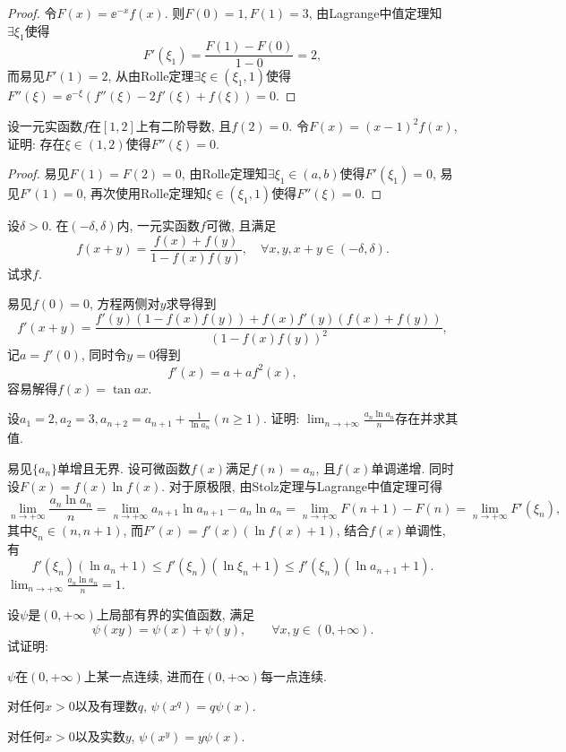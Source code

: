 \begin{quiza}
\begin{proof}
令\(F(x)=\ee^{-x}f(x).\) 则\(F(0)=1,F(1)=3\), 由Lagrange中值定理知\(\exists \xi_1\)使得\[F'(\xi_1)=\frac{F(1)-F(0)}{1-0}=2,\]而易见\(F'(1)=2\), 从由Rolle定理\(\exists \xi\in(\xi_1,1)\)使得\(F''(\xi)=\ee^{-\xi}\left(f''(\xi)-2f'(\xi)+f(\xi)\right)=0\).
\end{proof}
\woe 设一元实函数\(f\)在\([1,2]\)上有二阶导数, 且\(f(2)=0\). 令\(F(x)=(x-1)^2f(x)\), 证明: 存在\(\xi\in(1,2)\)使得\(F''(\xi)=0.\)
\begin{proof}
易见\(F(1)=F(2)=0\), 由Rolle定理知\(\exists \xi_1\in(a,b)\)使得\(F'(\xi_1)=0\), 易见\(F'(1)=0\), 再次使用Rolle定理知\(\xi\in(\xi_1,1)\)使得\(F''(\xi)=0\).
\end{proof}
\woe 设\(\delta>0\). 在\((-\delta,\delta)\)内, 一元实函数\(f\)可微, 且满足\[f(x+y)=\frac{f(x)+f(y)}{1-f(x)f(y)},\quad\forall x,y,x+y\in(-\delta,\delta).\]试求\(f\).
\begin{solution}
易见\(f(0)=0\), 方程两侧对\(y\)求导得到\[f'(x+y)=\frac{f'(y)\left(1-f(x)f(y)\right)+f(x)f'(y)\left(f(x)+f(y)\right)}{\left(1-f(x)f(y)\right)^2},\]记\(a=f'(0)\), 同时令\(y=0\)得到\[f'(x)=a+af^2(x),\]容易解得\(f(x)=\tan ax.\)
\end{solution}
\woe 设\(a_1=2,a_2=3,a_{n+2}=a_{n+1}+\frac{1}{\ln a_n}(n\geqslant 1)\). 证明: \(\lim_{n\rightarrow+\infty}\frac{a_n\ln a_n}{n}\)存在并求其值.
\begin{solution}
易见\(\{a_n\}\)单增且无界. 设可微函数\(f(x)\)满足\(f(n)=a_n\), 且\(f(x)\)单调递增. 同时设\(F(x)=f(x)\ln f(x)\). 对于原极限, 由Stolz定理与Lagrange中值定理可得\[\lim_{n\rightarrow+\infty}\frac{a_n\ln a_n}{n}=\lim_{n\rightarrow+\infty}a_{n+1}\ln a_{n+1}-a_n\ln a_n=\lim_{n\rightarrow+\infty}F(n+1)-F(n)=\lim_{n\rightarrow+\infty}F'(\xi_n),\]其中\(\xi_n\in(n,n+1)\), 而\(F'(x)=f'(x)\left(\ln f(x)+1\right)\), 结合\(f(x)\)单调性, 有\[f'(\xi_n)\left(\ln a_n+1\right)\leqslant f'(\xi_n)\left(\ln\xi_n+1\right)\leqslant f'(\xi_n)\left(\ln a_{n+1}+1\right).\]
\(\lim_{n\rightarrow+\infty}\frac{a_n\ln a_n}{n}=1.\)
\end{solution}
\woe 设\(\psi\)是\((0,+\infty)\)上局部有界的实值函数, 满足\[\psi(xy)=\psi(x)+\psi(y),\qquad\forall x,y\in(0,+\infty).\]试证明:
\begin{quizs}
\item \(\psi\)在\((0,+\infty)\)上某一点连续, 进而在\((0,+\infty)\)每一点连续.
\item 对任何\(x>0\)以及有理数\(q\), \(\psi(x^q)=q\psi(x).\)
\item 对任何\(x>0\)以及实数\(y\), \(\psi(x^y)=y\psi(x).\)
 

\end{quizs}
\end{quiza}
